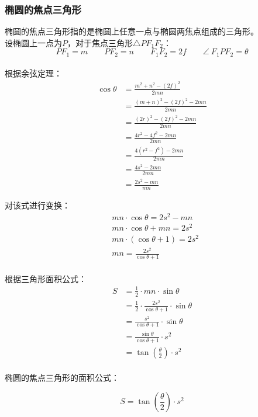\documentclass[UTF8]{ctexart}
\begin{document}
\subsubsection{椭圆的焦点三角形}
    椭圆的焦点三角形指的是椭圆上任意一点与椭圆两焦点组成的三角形。\\[3mm]
    设椭圆上一点为$P$，对于焦点三角形$\triangle PF_1F_2$：
    \setcounter{equation}{0}
    \begin{equation}
        PF_1=m\qquad PF_2=n\qquad F_1F_2=2f\qquad \angle~ F_1PF_2=\theta
    \end{equation}\\
    根据余弦定理：
    \begin{align}
        \cos{\theta}
        &=\frac{m^2+n^2-(2f)^2}{2mn}\\[5mm]
        &=\frac{(m+n)^2-(2f)^2-2mn}{2mn}\\[5mm]
        &=\frac{(2r)^2-(2f)^2-2mn}{2mn}\\[5mm]
        &=\frac{4r^2-4f^2-2mn}{2mn}\\[5mm]
        &=\frac{4(r^2-f^2)-2mn}{2mn}\\[5mm]
        &=\frac{4s^2-2mn}{2mn}\\[5mm]
        &=\frac{2s^2-mn}{mn}
    \end{align}

\newpage

    对该式进行变换：
    \begin{align}
        &mn\cdot\cos{\theta}=2s^2-mn\\[3mm]
        &mn\cdot\cos{\theta}+mn=2s^2\\[3mm]
        &mn\cdot(\cos{\theta}+1)=2s^2\\[3mm]
        &mn=\frac{2s^2}{\cos{\theta}+1}
    \end{align}\\
    根据三角形面积公式：
    \begin{align}
        S&=\frac{1}{2}\cdot mn\cdot\sin{\theta}\\[5mm]
        &=\frac{1}{2}\cdot \frac{2s^2}{\cos{\theta}+1}\cdot\sin{\theta}\\[5mm]
        &=\frac{s^2}{\cos{\theta}+1}\cdot\sin{\theta}\\[5mm]
        &=\frac{\sin{\theta}}{\cos{\theta}+1}\cdot s^2\\[5mm]
        &=\tan{\left(\frac{\theta}{2}\right)}\cdot s^2
    \end{align}\\
    椭圆的焦点三角形的面积公式：
    \begin{large}
        \begin{equation*}
            S=\tan{\left(\frac{\theta}{2}\right)}\cdot s^2
        \end{equation*}
    \end{large}
\end{document}
